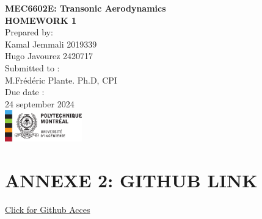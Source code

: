 \documentclass[12pt]{article}
\begin{document}
\begin{titlepage}
    \centering
    \vspace*{5cm}
    
    {\Huge \textbf{MEC6602E: Transonic Aerodynamics}}\\[1.5cm]
    
    {\Large \textbf{HOMEWORK 1}}\\[2cm]
    
    {\Large Prepared by:}\\
    {\Large Kamal Jemmali 2019339}\\
    {\Large Hugo Javourez 2420717}\\[1.5cm]
    
    {\Large Submitted to :}\\
    {\Large M.Frédéric Plante. Ph.D, CPI}\\[2cm]
    
    {\Large Due date :}\\
    {\Large 24 september 2024}\\
    
    \vfill
    \includegraphics[width=0.25\textwidth]{polytechnique-signature-rgb-gauche-fr.png} %
    
    \vfill
\end{titlepage}

\section{ANNEXE 2: GITHUB LINK}

\href{https://github.com/Kenesis69/MEC_6602E_HOMEWORK_1}{Click for Github Acces}
\end{document}
